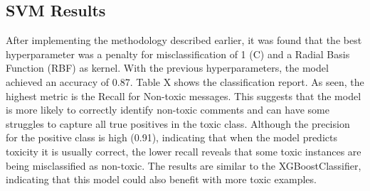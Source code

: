 \subsection{SVM Results}
After implementing the methodology described earlier, it was found that the best hyperparameter was a penalty for misclassification of 1 (C) and a Radial Basis Function (RBF) as kernel. With the previous hyperparameters, the model achieved an accuracy of 0.87. 
Table X shows the classification report. As seen, the highest metric is the Recall for Non-toxic messages. This suggests that the model is more likely to correctly identify non-toxic comments and can have some struggles to capture all true positives in the toxic class. Although the precision for the positive class is high (0.91), indicating that when the model predicts toxicity it is usually correct, the lower recall reveals that some toxic instances are being misclassified as non-toxic. The results are similar to the XGBoostClassifier, indicating that this model could also benefit with more toxic examples.